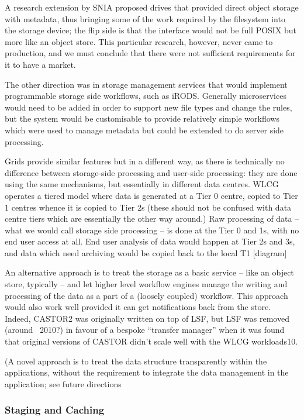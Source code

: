 \documentclass{../../template/esiwace-report}
\begin{document}
A research extension by SNIA proposed drives that provided direct object storage with metadata, thus bringing some of
the work required by the filesystem into the storage device; the flip side is that the interface would not be full POSIX
but more like an object store.  This particular research, however, never came to production, and we must conclude that
there were not sufficient requirements for it to have a market.

The other direction was in storage management services that would implement programmable storage side workflows, such as
iRODS.  Generally microservices would need to be added in order to support new file types and change the rules, but the
system would be customisable to provide relatively simple workflows which were used to manage metadata but could be
extended to do server side processing.

Grids provide similar features but in a different way, as there is technically no difference between storage-side
processing and user-side processing: they are done using the same mechanisms, but essentially in different data
centres. WLCG operates a tiered model where data is generated at a Tier 0 centre, copied to Tier 1 centres whence it is
copied to Tier 2s (these should not be confused with data centre tiers which are essentially the other way around.)  Raw
processing of data – what we would call storage side processing – is done at the Tier 0 and 1s, with no end user access
at all. End user analysis of data would happen at Tier 2s and 3s, and data which need archiving would be copied back to
the local T1 [diagram]

An alternative approach is to treat the storage as a basic service – like an object store, typically – and let higher
level workflow engines manage the writing and processing of the data as a part of a (loosely coupled) workflow.  This
approach would also work well provided it can get notifications back from the store.  Indeed, CASTOR2 was originally
written on top of LSF, but LSF was removed (around ~2010?) in favour of a bespoke “transfer manager” when it was found
that original versions of CASTOR didn’t scale well with the WLCG workloads10.

(A novel approach is to treat the data structure transparently within the applications, without the requirement to
integrate the data management in the application; see future directions


\subsubsection{Staging and Caching}
\end{document}
